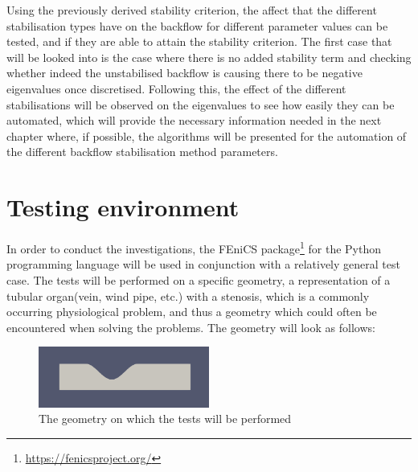 
Using the previously derived stability criterion, the affect that the different stabilisation types have on the backflow for different parameter values can be tested, and if they are able to attain the stability criterion. The first case that will be looked into is the case where there is no added stability term and checking whether indeed the unstabilised backflow is causing there to be negative eigenvalues once discretised. Following this, the effect of the different stabilisations will be observed on the eigenvalues to see how easily they can be automated, which will provide the necessary information needed in the next chapter where, if possible, the algorithms will be presented for the automation of the different backflow stabilisation method parameters.

\section{Testing environment}

In order to conduct the investigations, the FEniCS package\footnote{\url{https://fenicsproject.org/}} for the Python programming language will be used in conjunction with a relatively general test case. The tests will be performed on a specific geometry, a representation of a tubular organ(vein, wind pipe, etc.) with a stenosis, which is a commonly occurring physiological problem, and thus a geometry which could often be encountered when solving the problems. The geometry will look as follows:\\
\begin{figure}[h]
\centering
\includegraphics[width=0.5\textwidth]{latex/Thesis/media/stenosis.png}
\caption{The geometry on which the tests will be performed\label{fig:testgeo}}
\end{figure}

